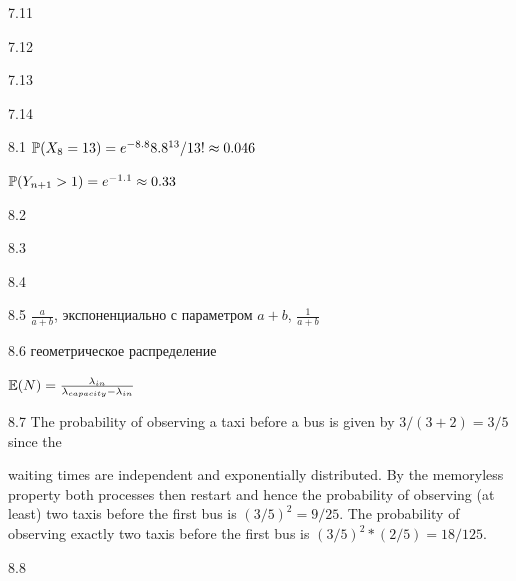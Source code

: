 \protect \hypertarget {soln:7.11}{}
\begin{solution}{{7.11}}
\end{solution}
\protect \hypertarget {soln:7.12}{}
\begin{solution}{{7.12}}
\end{solution}
\protect \hypertarget {soln:7.13}{}
\begin{solution}{{7.13}}
\end{solution}
\protect \hypertarget {soln:7.14}{}
\begin{solution}{{7.14}}
\end{solution}
\protect \hypertarget {soln:8.1}{}
\begin{solution}{{8.1}}
  $\P(X_8=13)=e^{-8.8}8.8^{13}/13!\approx 0.046$

  $\P(Y_{n+1}>1)=e^{-1.1}\approx 0.33$
\end{solution}
\protect \hypertarget {soln:8.2}{}
\begin{solution}{{8.2}}
\end{solution}
\protect \hypertarget {soln:8.3}{}
\begin{solution}{{8.3}}
\end{solution}
\protect \hypertarget {soln:8.4}{}
\begin{solution}{{8.4}}
\end{solution}
\protect \hypertarget {soln:8.5}{}
\begin{solution}{{8.5}}
$\frac{a}{a+b}$, экспоненциально с параметром $a+b$, $\frac{1}{a+b}$
\end{solution}
\protect \hypertarget {soln:8.6}{}
\begin{solution}{{8.6}}
  геометрическое распределение

  $\E(N)=\frac{\lambda_{in}}{\lambda_{capacity}-\lambda_{in}}$
\end{solution}
\protect \hypertarget {soln:8.7}{}
\begin{solution}{{8.7}}
  The probability of observing a taxi before a bus is given by $3/(3+2)=3/5$ since the

  waiting times are independent and exponentially distributed. By the memoryless
  property both processes then restart and hence the probability of observing (at least)
  two taxis before the first bus is $(3/5)^2=9/25$. The probability of observing exactly
  two taxis before the first bus is $(3/5)^2*(2/5)=18/125$.
\end{solution}
\protect \hypertarget {soln:8.8}{}
\begin{solution}{{8.8}}
\end{solution}
